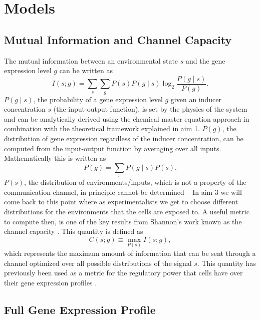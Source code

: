 \section{Models}

\subsection{Mutual Information and Channel Capacity}

The mutual information
between an environmental state $s$ and the gene expression level $g$ can be
written as
\begin{equation}
I(s;g) = \sum_s \sum_g P(s) P(g \mid s) \log_2 \frac{P(g \mid s)}{P(g)}.
\end{equation}
$P(g \mid s)$, the probability of a gene expression level $g$
given an inducer concentration $s$ (the input-output function), is set by the
physics of the system and can be analytically derived using the chemical master
equation approach \cite{Shahrezaei2008, Swain2016} in combination with the
theoretical framework explained in aim 1. $P(g)$, the distribution of gene
expression regardless of the inducer concentration, can be computed from the
input-output function by averaging over all inputs. Mathematically this is
written as
\begin{equation}
P(g) = \sum_s P(g \mid s) P(s).
\end{equation}
$P(s)$, the distribution of environments/inputs, which is not a property of the
communication channel, in principle cannot be determined -- In aim 3 we will
come back to this point where as experimentalists we get to choose different
distributions for the environments that the cells are exposed to. A useful
metric to compute then, is one of the key results from Shannon's work known as
the channel capacity \cite{Rhee2012a}. This quantity is defined as
\begin{equation}
C(s; g) \equiv \max_{P(s)} I(s; g),
\end{equation}
which represents the maximum amount of information that can be sent through a
channel optimized over all possible distributions of the signal $s$.
This quantity has previously been used as a metric for the regulatory power that
cells have over their gene expression profiles \cite{Tkacik2008a, Rieckh2014}.

\subsection{Full Gene Expression Profile}

